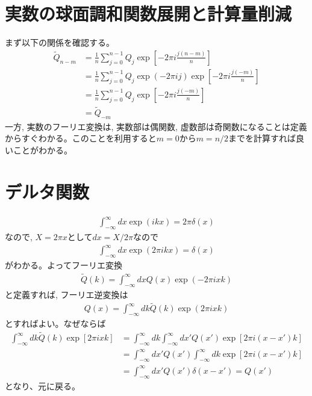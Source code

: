 \documentclass[a4j, 12pt]{ltjarticle}
\begin{document}
    \section{実数の球面調和関数展開と計算量削減}
    まず以下の関係を確認する。
    \begin{align}
        \tilde{Q}_{n-m} &= \frac{1}{n}\sum_{j=0}^{n-1} Q_j \exp\left[-2\pi i \frac{j(n-m)}{n}\right] \nonumber\\
        &=
        \frac{1}{n}\sum_{j=0}^{n-1} Q_j 
        \exp\left(-2\pi ij\right)
        \exp\left[-2\pi i \frac{j(-m)}{n}\right] \nonumber\\
        &=
        \frac{1}{n}\sum_{j=0}^{n-1} Q_j 
        \exp\left[-2\pi i \frac{j(-m)}{n}\right] \nonumber\\
        & = \tilde{Q}_{-m}
    \end{align}
    一方, 実数のフーリエ変換は, 実数部は偶関数, 虚数部は奇関数になることは定義からすぐわかる。このことを利用すると$m=0$から$m=n/2$までを計算すれば良いことがわかる。
    \appendix
    \section{デルタ関数}
    \begin{align}
        \int_{-\infty}^\infty dx \exp\left(ikx\right) = 2\pi\delta(x)
    \end{align}
    なので, $X = 2\pi x$として$dx = X/2\pi$なので
    \begin{align}
        \int_{-\infty}^\infty dx \exp\left(2\pi ikx\right) = \delta(x)
    \end{align}
    がわかる。よってフーリエ変換
    \begin{align}
        \tilde{Q}(k) = \int_{-\infty}^\infty dx Q(x) \exp\left(-2\pi i xk\right)
    \end{align}
    と定義すれば, フーリエ逆変換は
    \begin{align}
        Q(x) = \int_{-\infty}^\infty dk \tilde{Q}(k) \exp\left(2\pi i xk\right)
    \end{align}
    とすればよい。なぜならば
    \begin{align}
        \int_{-\infty}^\infty dk \tilde{Q}(k)
        \exp\left[2\pi ixk\right] &= 
        \int_{-\infty}^\infty dk \int_{-\infty}^\infty dx' Q(x')\exp[2\pi i (x-x')k] \\
        &= \int_{-\infty}^\infty dx' Q(x') \int_{-\infty}^\infty dk \exp[2\pi i(x-x')k] \\
        &= \int_{-\infty}^\infty dx' Q(x') \delta(x-x') = Q(x')        
    \end{align}
    となり、元に戻る。
\end{document}
